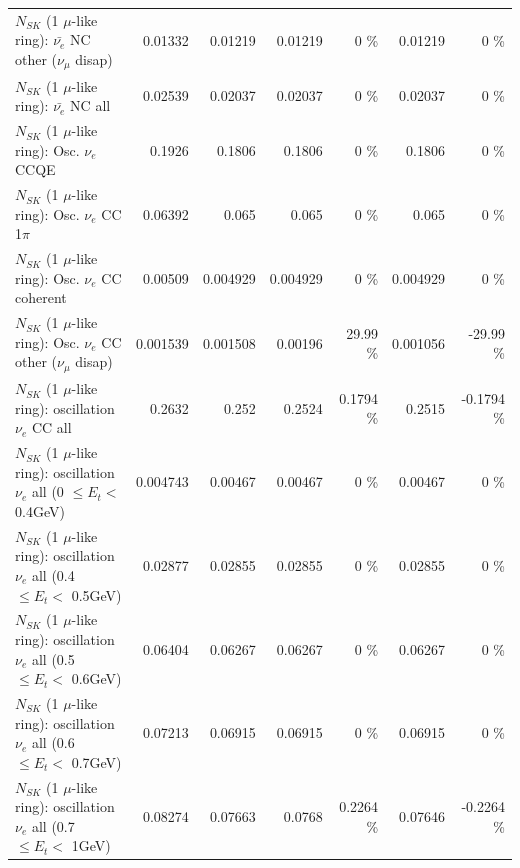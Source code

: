 \begin{table}
\begin{tabular}{| l | r | r | r  r | r  r |}
          $N_{SK}$ (1 $\mu$-like ring): $\bar{\nu_e}$ NC other ($\nu_\mu$ disap) &         0.01332 &         0.01219 &         0.01219 &        0 \%  &         0.01219 &        0 \%  \\ 
                            $N_{SK}$ (1 $\mu$-like ring): $\bar{\nu_{e}}$ NC all &         0.02539 &         0.02037 &         0.02037 &        0 \%  &         0.02037 &        0 \%  \\ 
\hline
\hline
\hline
                                 $N_{SK}$ (1 $\mu$-like ring): Osc. $\nu_e$ CCQE &          0.1926 &          0.1806 &          0.1806 &        0 \%  &          0.1806 &        0 \%  \\ 
                            $N_{SK}$ (1 $\mu$-like ring): Osc. $\nu_e$ CC 1$\pi$ &         0.06392 &           0.065 &           0.065 &        0 \%  &           0.065 &        0 \%  \\ 
                          $N_{SK}$ (1 $\mu$-like ring): Osc. $\nu_e$ CC coherent &         0.00509 &        0.004929 &        0.004929 &        0 \%  &        0.004929 &        0 \%  \\ 
           $N_{SK}$ (1 $\mu$-like ring): Osc. $\nu_e$ CC other ($\nu_\mu$ disap) &        0.001539 &        0.001508 &         0.00196 &    29.99 \%  &        0.001056 &   -29.99 \%  \\ 
                        $N_{SK}$ (1 $\mu$-like ring): oscillation $\nu_e$ CC all &          0.2632 &           0.252 &          0.2524 &   0.1794 \%  &          0.2515 &  -0.1794 \%  \\ 
\hline
$N_{SK}$ (1 $\mu$-like ring): oscillation $\nu_{e}$ all (0 $\leq E_{t} <$ 0.4GeV) &        0.004743 &         0.00467 &         0.00467 &        0 \%  &         0.00467 &        0 \%  \\ 
$N_{SK}$ (1 $\mu$-like ring): oscillation $\nu_{e}$ all (0.4 $\leq E_{t} <$ 0.5GeV) &         0.02877 &         0.02855 &         0.02855 &        0 \%  &         0.02855 &        0 \%  \\ 
$N_{SK}$ (1 $\mu$-like ring): oscillation $\nu_{e}$ all (0.5 $\leq E_{t} <$ 0.6GeV) &         0.06404 &         0.06267 &         0.06267 &        0 \%  &         0.06267 &        0 \%  \\ 
$N_{SK}$ (1 $\mu$-like ring): oscillation $\nu_{e}$ all (0.6 $\leq E_{t} <$ 0.7GeV) &         0.07213 &         0.06915 &         0.06915 &        0 \%  &         0.06915 &        0 \%  \\ 
$N_{SK}$ (1 $\mu$-like ring): oscillation $\nu_{e}$ all (0.7 $\leq E_{t} <$ 1GeV) &         0.08274 &         0.07663 &          0.0768 &   0.2264 \%  &         0.07646 &  -0.2264 \%  \\ 

\end{tabular}
\end{table}
